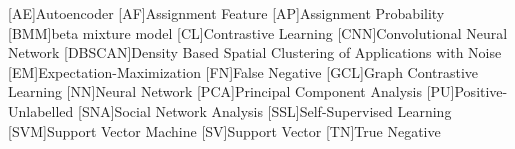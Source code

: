 \begin{acronym}

    [AE]{Autoencoder}
    [AF]{Assignment Feature}
    [AP]{Assignment Probability}
    [BMM]{beta mixture model}
    [CL]{Contrastive Learning}
    [CNN]{Convolutional Neural Network}
    [DBSCAN]{Density Based Spatial Clustering of Applications with Noise}
    [EM]{Expectation-Maximization}
    [FN]{False Negative}
    [GCL]{Graph Contrastive Learning}
    [NN]{Neural Network}
    [PCA]{Principal Component Analysis}
    [PU]{Positive-Unlabelled}
    [SNA]{Social Network Analysis}    
    [SSL]{Self-Supervised Learning}
    [SVM]{Support Vector Machine}
    [SV]{Support Vector}
    [TN]{True Negative}

\end{acronym}